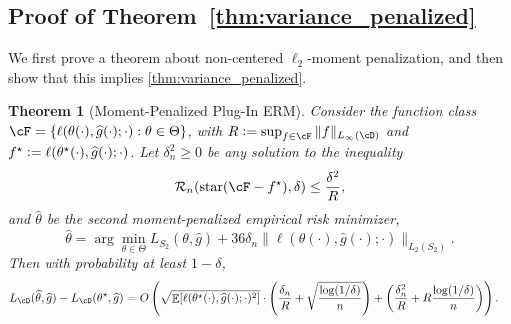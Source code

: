 \documentclass[11pt]{article} %
\newcommand{\pref}[1]{\cref{#1}}
\theoremstyle{theorem}  %
\newtheorem{theorem}{Theorem}
\theoremstyle{plain}
\DeclarePairedDelimiter{\brk}{[}{]}
\DeclareMathOperator{\En}{\mathbb{E}}
\newcommand{\veps}{\varepsilon}
\newcommand{\ldef}{\vcentcolon=}
\newcommand{\wh}[1]{\widehat{#1}}
\newcommand{\sh}{\ensuremath{\mathrm{star}}}
\newcommand{\Radexp}{\mathcal{R}_n}
\newcommand{\poprisk}{L_{\cD}}
\newcommand{\estone}{\wh{g}}
\newcommand{\esttwo}{\wh{\theta}}
\newcommand{\target}{\Theta}
\newcommand{\besttwo}{\theta^{\star}}
\newcommand{\sampletwo}{S_2}
\newcommand{\fstar}{f^{\star}}
\begin{document}

\subsection{Proof of Theorem~\ref*{thm:variance_penalized}}

We first prove a theorem about non-centered $\ell_2$-moment penalization, and then show that this implies \pref{thm:variance_penalized}.

\begin{theorem}[Moment-Penalized Plug-In ERM]\label{thm:moment_penalized}
Consider the function class $\cF = \{\ell(\theta(\cdot), \estone(\cdot); \cdot): \theta \in \target\}$, with $R\ldef\sup_{f\in \cF}\|f\|_{L_{\infty}(\cD)}$ and $\fstar\ldef\ell(\besttwo(\cdot), \estone(\cdot); \cdot)$. Let $\delta_n^2 \geq 0$ be any solution to the inequality
\begin{equation}
  \label{eq:moment_critical}
\Radexp(\sh(\cF - f^\star),\delta) \leq \frac{\delta^2}{R},
\end{equation}
and $\esttwo$ be the second moment-penalized empirical risk minimizer,
\begin{equation*}
\esttwo = \arg\min_{\theta\in \target} L_{\sampletwo}(\theta, \estone) + 36 \delta_n \|\ell(\theta(\cdot),\estone(\cdot);\cdot)\|_{L_2(\sampletwo)}.
\end{equation*}
Then with probability at least $1-\delta$, 
\begin{align*}
\poprisk(\esttwo, \estone) - \poprisk(\besttwo, \estone) =~& O\left(\sqrt{\En\brk*{\ell(\besttwo(\cdot), \estone(\cdot); \cdot)^2}}\cdot\left(\frac{\delta_n}{R}+\sqrt{\frac{\log(1/\delta)}{n}}\right) + \left(\frac{\delta_n^2}{R}+R\frac{\log(1/\delta)}{n}\right)\right).
\end{align*}
\end{theorem}
%
\end{document}
